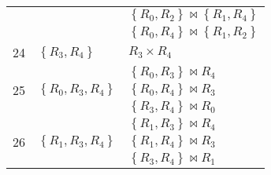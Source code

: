\documentclass[12pt]{scrartcl}
\begin{document}
\begin{enumerate}
\begin{table}[H]
\begin{center}
\begin{tabular}{lll}
									&																			& $\left\lbrace R_{0}, R_{2}\right\rbrace \bowtie \left\lbrace R_{1}, R_{4}\right\rbrace $ \\
									&																			& $\left\lbrace R_{0}, R_{4}\right\rbrace \bowtie \left\lbrace R_{1}, R_{2}\right\rbrace $ \\ \hline
				24	&$\left\lbrace R_{3}, R_{4}\right\rbrace $	 & $R_{3} \times R_{4}$			\\ \hline
				\multirow{3}{*}{25}	&\multirow{3}{*}{$\left\lbrace R_{0}, R_{3}, R_{4}\right\rbrace$}			& $\left\lbrace R_{0}, R_{3}\right\rbrace \bowtie R_{4}$ \\
									&																	& $\left\lbrace R_{0}, R_{4}\right\rbrace \bowtie R_{3}$ \\
									&																	& $\left\lbrace R_{3}, R_{4}\right\rbrace \bowtie R_{0}$ \\ \hline
				\multirow{3}{*}{26}	&\multirow{3}{*}{$\left\lbrace R_{1}, R_{3}, R_{4}\right\rbrace$}			& $\left\lbrace R_{1}, R_{3}\right\rbrace \bowtie R_{4}$ \\
									&																	& $\left\lbrace R_{1}, R_{4}\right\rbrace \bowtie R_{3}$ \\
									&																	& $\left\lbrace R_{3}, R_{4}\right\rbrace \bowtie R_{1}$ \\ \hline
			\end{tabular}
		\end{center}
	\end{table}


\end{enumerate}
\end{document}
